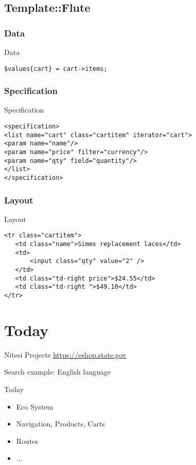 \subsection{Template::Flute}
\subsubsection{Data}
\begin{frame}[fragile]{Data}
\begin{lstlisting}
$values{cart} = cart->items;
\end{lstlisting}
\end{frame}

\subsubsection{Specification}
\begin{frame}[fragile]{Specification}
\begin{lstlisting}
<specification>
<list name="cart" class="cartitem" iterator="cart">
<param name="name"/>
<param name="price" filter="currency"/>
<param name="qty" field="quantity"/>
</list>
</specification>
\end{lstlisting}
\end{frame}

\subsubsection{Layout}
\begin{frame}[fragile]{Layout}
\begin{lstlisting}
<tr class="cartitem">
   <td class="name">Simms replacement laces</td>
   <td>
       <input class="qty" value="2" />
   </td>
   <td class="td-right price">$24.55</td>
   <td class="td-right ">$49.10</td>
</tr>
\end{lstlisting}
\end{frame}

\section{Today}
\begin{frame}{Nitesi Projects}
\url{https://eshop.state.gov}
\end{frame}

Search example: English language 

\begin{frame}{Today}
\begin{itemize}
\item Eco System
\item Navigation, Products, Carts
\item Routes
\item ...
\end{itemize}
\end{frame}


